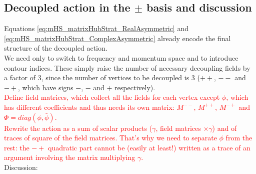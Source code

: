 \documentclass[a4paper,11pt, english]{article}
\newcommand{\ssubsection}[2]{\subsection{\texorpdfstring{#1}{#2}}}
\theoremstyle{remark}
\newcommand{\nline}{\\[0.3cm]}
\begin{document}
\ssubsection{Decoupled action in the $\pm$ basis and discussion}{Decoupled action in the pm basis and discussion}
Equations \eqref{eq:mHS_matrixHubStrat_RealAsymmetric} and \eqref{eq:mHS_matrixHubStrat_ComplexAsymmetric} already encode the final structure of the decoupled action.\\ We need only to switch to frequency and momentum space and to introduce contour indices. These simply raise the number of necessary decoupling fields by a factor of 3, since the number of vertices to be decoupled is 3 ($++$, $--$ and $-+$, which have signs $-$, $-$ and $+$ respectively).\nline
\textcolor{red}{Define field matrices, which collect all the fields for each vertex except $\phi$, which has different coefficients and thus needs its own matrix: $M^{--}$, $M^{++}$, $M^{-+}$ and $\Phi = diag(\phi,\bar\phi)$.\\
Rewrite the action as a sum of scalar products ($\gamma$, field matrices $\times \gamma$) and of traces of square of the field matrices. That's why we need to separate $\phi$ from the rest: the $-+$ quadratic part cannot be (easily at least!) written as a trace of an argument involving the matrix multiplying $\gamma$.}\nline
Discussion:
\end{document}
